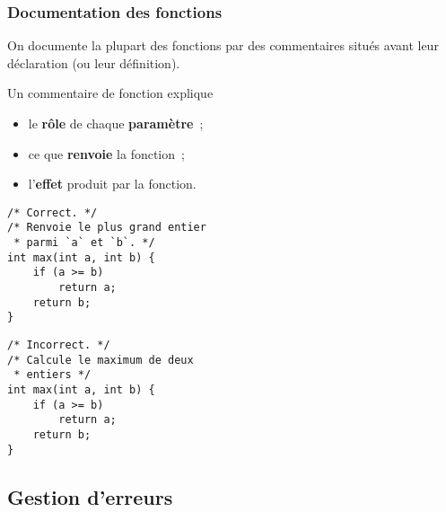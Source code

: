 \begin{frame}[fragile] \frametitle{Documentation des fonctions}
On documente la plupart des \alert{fonctions} par des commentaires 
situés avant leur déclaration (ou leur définition).
\medskip 

Un commentaire de fonction explique

\begin{itemize}
    \item le {\bf rôle} de chaque {\bf paramètre}~;
    \smallskip
    
    \item ce que {\bf renvoie} la fonction~; 
    \smallskip
     
    \item l'{\bf effet} produit par la fonction.
\end{itemize}

\begin{multicols}{2}
\begin{lstlisting}
/* Correct. */
/* Renvoie le plus grand entier 
 * parmi `a` et `b`. */
int max(int a, int b) {
    if (a >= b) 
        return a;
    return b;
}
\end{lstlisting}

\begin{lstlisting}
/* Incorrect. */
/* Calcule le maximum de deux 
 * entiers */
int max(int a, int b) {
    if (a >= b) 
        return a;
    return b;
}
\end{lstlisting}
\end{multicols}
\end{frame}

\subsection{Gestion d'erreurs}

